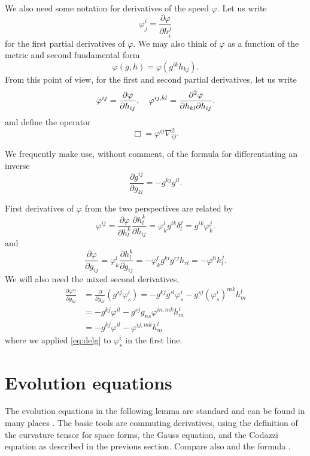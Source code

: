 \documentclass{amsart}
\begin{document}
We also need some notation for derivatives of the speed \(\varphi\). Let us write
\[
\varphi^{i}_{j} = \frac{\partial \varphi}{\partial h^{j}_{i}}
\]
for the first partial derivatives of \(\varphi\). We may also think of \(\varphi\) as a function of the metric and second fundamental form
\[
\varphi(g, h) = \varphi(g^{ik} h_{kj}).
\]
From this point of view, for the first and second partial derivatives, let us write
\[
\varphi^{ij} = \frac{\partial\varphi}{\partial h_{ij}}, \quad \varphi^{ij,kl} = \frac{\partial^2\varphi}{\partial h_{kl} \partial h_{ij}}.
\]
and define the operator
\[
\Box = \varphi^{ij} \nabla^2_{ij}.
\]

We frequently make use, without comment, of the formula for differentiating an inverse
\[
\frac{\partial g^{ij}}{\partial g_{kl}} = - g^{kj} g^{il}.
\]

First derivatives of \(\varphi\) from the two perspectives are related by
\begin{equation}
\label{eq:delh}
\varphi^{ij} = \frac{\partial \varphi}{\partial h_l^k} \frac{\partial h_l^k}{\partial h_{ij}} = \varphi^l_k g^{ik} \delta^j_l = g^{ik} \varphi^j_k.
\end{equation}
and
\begin{equation}
\label{eq:delg}
\frac{\partial\varphi}{\partial g_{ij}} = \varphi^{l}_{k} \frac{\partial h^{k}_{l}}{\partial g_{ij}} = -\varphi^{l}_{k} g^{ki} g^{rj} h_{rl} = -\varphi^{li}h^{j}_{l}.
\end{equation}
We will also need the mixed second derivatives,
\begin{equation}
\label{eq:delhdelg}
\begin{split}
\frac{\partial \varphi^{ij}}{\partial g_{kl}} &= \frac{\partial}{\partial g_{kl}} \left(g^{sj} \varphi^{i}_{s} \right) = - g^{kj}g^{sl} \varphi^{i}_{s} - g^{sj} (\varphi^i_s)^{mk} h^l_m \\
&= - g^{kj} \varphi^{il} - g^{sj} g_{ns} \varphi^{in,mk} h^l_m \\
&= - g^{kj} \varphi^{il} - \varphi^{ij,mk} h^l_m
\end{split}
\end{equation}
where we applied \cref{eq:delg} to \(\varphi^i_s\) in the first line.

\section{Evolution equations}

The evolution equations in the following lemma are standard and can be found in many places \cite{MR1316556, MR1100812, MR1296393, MR1480081}. The basic tools are commuting derivatives, using the definition of the curvature tensor for space forms, the Gauss equation, and the Codazzi equation as described in the previous section. Compare also \cite[p.~94-95]{Gerhardt:/2006} and the formula \cite[eq.~(6.17)]{Gerhardt:01/1996}.
\end{document}
